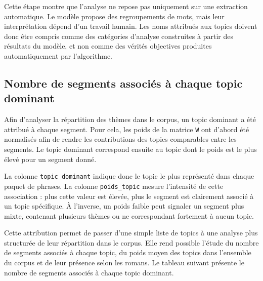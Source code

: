 Cette étape montre que l’analyse ne repose pas uniquement sur une extraction automatique. Le modèle propose des regroupements de mots, mais leur interprétation dépend d’un travail humain. Les noms attribués aux topics doivent donc être compris comme des catégories d’analyse construites à partir des résultats du modèle, et non comme des vérités objectives produites automatiquement par l’algorithme.

\subsection{Nombre de segments associés à chaque topic dominant}

Afin d'analyser la répartition des thèmes dans le corpus, un topic dominant a été attribué à chaque segment. Pour cela, les poids de la matrice \texttt{W} ont d'abord été normalisés afin de rendre les contributions des topics comparables entre les segments. Le topic dominant correspond ensuite au topic dont le poids est le plus élevé pour un segment donné.

La colonne \texttt{topic\_dominant} indique donc le topic le plus représenté dans chaque paquet de phrases. La colonne \texttt{poids\_topic} mesure l'intensité de cette association : plus cette valeur est élevée, plus le segment est clairement associé à un topic spécifique. À l'inverse, un poids faible peut signaler un segment plus mixte, contenant plusieurs thèmes ou ne correspondant fortement à aucun topic.

Cette attribution permet de passer d'une simple liste de topics à une analyse plus structurée de leur répartition dans le corpus. Elle rend possible l'étude du nombre de segments associés à chaque topic, du poids moyen des topics dans l'ensemble du corpus et de leur présence selon les romans. Le tableau suivant présente le nombre de segments associés à chaque topic dominant.

